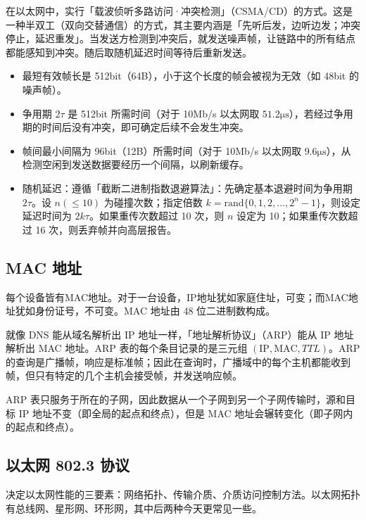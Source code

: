 \documentclass[UTF8]{ctexart}
\newcommand\Concept[1]{\textcolor{cyan!70!black}{#1}}
\begin{document}
在以太网中，实行\Concept{「载波侦听多路访问·冲突检测」（CSMA/CD）}的方式。这是一种半双工（双向交替通信）的方式，其主要内涵是「先听后发，边听边发；冲突停止，延迟重发」。当发送方检测到冲突后，就发送噪声帧，让链路中的所有结点都能感知到冲突。随后取随机延迟时间等待后重新发送。
\begin{itemize}[itemsep=0pt,parsep=0pt]
  \item 最短有效帧长是 512bit（64B），小于这个长度的帧会被视为无效（如 48bit 的噪声帧）。
  \item 争用期 $2\tau$ 是 512bit 所需时间（对于 10Mb/s 以太网取 $\mathrm{51.2\mu s}$），若经过争用期的时间后没有冲突，即可确定后续不会发生冲突。
  \item 帧间最小间隔为 96bit（12B）所需时间（对于 10Mb/s 以太网取 $\mathrm{9.6\mu s}$），从检测空闲到发送数据要经历一个间隔，以刷新缓存。
  \item 随机延迟：遵循\Concept{「截断二进制指数退避算法」}：先确定基本退避时间为争用期 $2\tau$。设 $n(\leqslant 10)$ 为碰撞次数；指定倍数 $k = \mathrm{rand}\{0,1,2,\dots, 2^n-1\}$，则设定延迟时间为 $2k\tau$。如果重传次数超过 10 次，则 $n$ 设定为 10；如果重传次数超过 16 次，则丢弃帧并向高层报告。
\end{itemize}

\subsection{MAC 地址}
每个设备皆有MAC地址。对于一台设备，IP地址犹如家庭住址，可变；而MAC地址犹如身份证号，不可变。MAC 地址由 48 位二进制数构成。

就像 DNS 能从域名解析出 IP 地址一样，\Concept{「地址解析协议」（ARP）}能从 IP 地址解析出 MAC 地址。ARP 表的每个条目记录的是三元组 $(\mathrm{IP,MAC},TTL)$。ARP 的查询是广播帧，响应是标准帧；因此在查询时，广播域中的每个主机都能收到帧，但只有特定的几个主机会接受帧，并发送响应帧。

ARP 表只服务于所在的子网，因此数据从一个子网到另一个子网传输时，源和目标 IP 地址不变（即全局的起点和终点），但是 MAC 地址会辗转变化（即子网内的起点和终点）。

\subsection{以太网 802.3 协议}
决定以太网性能的三要素：网络拓扑、传输介质、介质访问控制方法。以太网拓扑有总线网、星形网、环形网，其中后两种今天更常见一些。
\end{document}
